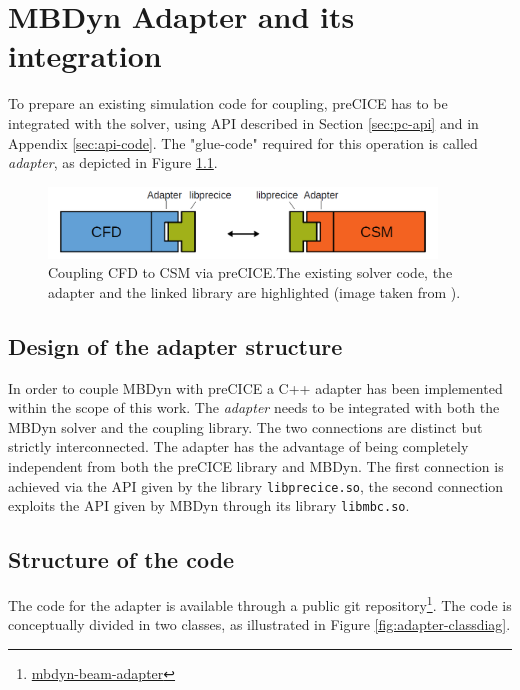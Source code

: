 \chapter{MBDyn Adapter and its integration}
\label{cha:adapter}


To prepare an existing simulation code for coupling, preCICE has to be integrated with the solver, using  API described in Section \ref{sec:pc-api} and in Appendix \ref{sec:api-code}. The "glue-code" required for this operation is called \textit{adapter}, as depicted in Figure \ref{fig:adapter-scheme}.


\begin{figure}[htbp!]
	\centering
	\includegraphics[width=0.92\textwidth]{images/adapter_scheme}
	\caption{Coupling CFD to CSM via preCICE.The existing solver code, the adapter and the linked library are highlighted (image taken from \cite{uekermann2017official}).}
	\label{fig:adapter-scheme}
\end{figure}


\section{Design of the adapter structure}


In order to couple MBDyn with preCICE a C++ adapter has been implemented within the scope of this work. The \textit{adapter} needs to be integrated with both the MBDyn solver and the coupling library. The two connections are distinct but strictly interconnected.
The adapter has the advantage of being completely independent from both the preCICE library and MBDyn. The first connection is achieved via the API given by the library \texttt{libprecice.so}, the second connection exploits the API given by MBDyn through its library \texttt{libmbc.so}.


\section{Structure of the code}

The code for the adapter is available through a public git repository\footnote{\href{https://gitlab.com/Ccaccia73/mbdyn-adapter-test/-/tree/develop}{mbdyn-beam-adapter}}. The code is conceptually divided in two classes, as illustrated in Figure \ref{fig:adapter-classdiag}.

